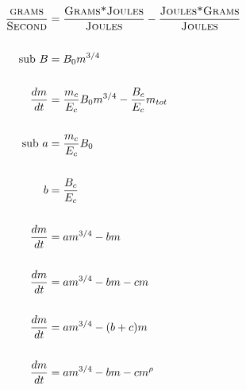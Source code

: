 \documentclass[a4paper]{article} %
\begin{document}
\begin{align*}
    \frac{\textsc{grams}}{\textsc{Second}} &= \frac{\textsc{Grams*Joules}}{\textsc{Joules}} - \frac{\textsc{Joules*Grams}}{\textsc{Joules}} \\ \\
    \text{sub } B &= B_{0}m^{3/4}  \\ \\
    \frac{dm}{dt} &= \frac{m_c}{E_c}B_{0}m^{3/4} - \frac{B_{c}}{E_c}m_{tot} \\ \\
    \text{sub } a &= \frac{m_c}{E_c}B_{0}  \\ \\
    b &= \frac{B_{c}}{E_c} \\ \\
    \frac{dm}{dt} &= am^{3/4} - bm \\ \\
    \frac{dm}{dt} &= am^{3/4} - bm - cm \\ \\
    \frac{dm}{dt} &= am^{3/4} - (b+c)m \\ \\
    \frac{dm}{dt} &= am^{3/4} - bm - cm^{\rho} \\ \\
\end{align*}
\end{document}
